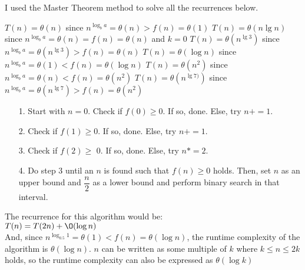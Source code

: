 \documentclass[12pt,twoside]{article}
\begin{document}
\begin{problems}
\problem  I used the Master Theorem method to solve all the recurrences below.%

\begin{problemparts}

\problempart $ T(n) = \theta(n)$ since $ n^{\log_{b}a} = \theta(n) > f(n) = \theta(1)  $
\problempart  $ T(n) = \theta(n\lg n )$ since $n^{\log_{b}a} = \theta(n) =  f(n) = \theta(n)$ and $ k=0 $
\problempart $ T(n) = \theta(n^{\lg 3 })$ since $n^{\log_{b}a} = \theta(n^{\lg3}) > f(n) = \theta(n)$
\problempart $ T(n) = \theta(\log n)$ since $n^{\log_{b}a} = \theta(1) < f(n) = \theta(\log n) $
\problempart $ T(n) = \theta(n^{2})$ since $n^{\log_{b}a} = \theta(n) <  f(n) = \theta(n^{2}) $
\problempart $ T(n) = \theta(n^{\lg 7)})$ since $n^{\log_{b}a} = \theta(n^{\lg7}) > f(n) = \theta(n^{2}) $
\end{problemparts}

\problem  %

\begin{itemize}
	\item[1. ] Start with $ n= 0 $. Check if $ f(0)\geq 0 $. If so, done. Else, try $n+=1 $.
	\item[2. ]  Check if $ f(1)\geq 0 $. If so, done. Else, try $ n+=1 $.
	\item[3.  ]  Check if $ f(2) \geq $ 0. If so, done. Else, try $n*=2$.
	\item[4. ]  Do step 3 until an $ n $ is found such that $ f(n) \geq 0 $ holds. Then, set $ n $ as an upper bound  and $ \dfrac{n}{2} $ as a lower bound and perform binary search in that interval.

\end{itemize}

	The recurrence for this algorithm would be:\\

 $ T(n) = T(2n) + \O (\log n)$ \\
 
 And, since $n^{\log_{0.5}1} = \theta(1) <  f(n) = \theta(\log n) $, the runtime complexity of the algorithm is  $ \theta(\log n) $. $ n $ can be written as some multiple of $ k $ where $ k \leq n \leq 2k$ holds, so the runtime complexity can also be expressed as $ \theta(\log k) $ 
 


\problem  %


\end{problems}
\end{document}
